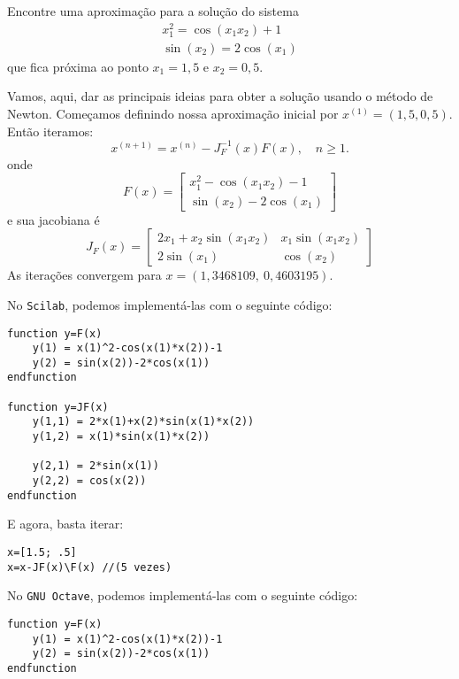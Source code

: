 \begin{ex} Encontre uma aproximação para a solução do sistema
\begin{eqnarray}
x_1^2=\cos(x_1x_2)+1\\
\sin(x_2)=2\cos(x_1)
\end{eqnarray}
que fica próxima ao ponto $x_1=1,5$ e $x_2=0,5$.
\end{ex}
\begin{sol} Vamos, aqui, dar as principais ideias para obter a solução usando o método de Newton.
Começamos definindo nossa aproximação inicial por $x^{(1)} = (1,5, 0,5)$. Então iteramos:
\begin{equation}
  x^{(n+1)} = x^{(n)} - J_F^{-1}(x)F(x), \quad n\geq 1.
\end{equation}
onde
  \begin{equation}
    F(x)=\left[\begin{array}{c}
        \displaystyle x_1^2-\cos(x_1x_2)-1\\
        \displaystyle \sin(x_2)-2\cos(x_1)
      \end{array}\right]
  \end{equation}
e sua jacobiana é
\begin{equation}
  J_F(x) = \left[\begin{array}{cc}
    \displaystyle 2x_1 +x_2\sin(x_1x_2) & x_1\sin(x_1x_2)\\
    \displaystyle 2\sin(x_1) & \cos(x_2)
  \end{array}\right]
\end{equation}
As iterações convergem para $x = (1,3468109,~0,4603195)$.

\ifisscilab
No \verb+Scilab+, podemos implementá-las com o seguinte código:
\begin{verbatim}
function y=F(x)
    y(1) = x(1)^2-cos(x(1)*x(2))-1
    y(2) = sin(x(2))-2*cos(x(1))
endfunction

function y=JF(x)
    y(1,1) = 2*x(1)+x(2)*sin(x(1)*x(2))
    y(1,2) = x(1)*sin(x(1)*x(2))

    y(2,1) = 2*sin(x(1))
    y(2,2) = cos(x(2))
endfunction
\end{verbatim}

E agora, basta iterar:
\begin{verbatim}
x=[1.5; .5]
x=x-JF(x)\F(x) //(5 vezes)
\end{verbatim}
\fi
\ifisoctave
No \verb+GNU Octave+, podemos implementá-las com o seguinte código:
\begin{verbatim}
function y=F(x)
    y(1) = x(1)^2-cos(x(1)*x(2))-1
    y(2) = sin(x(2))-2*cos(x(1))
endfunction


\end{verbatim}
\end{sol}
